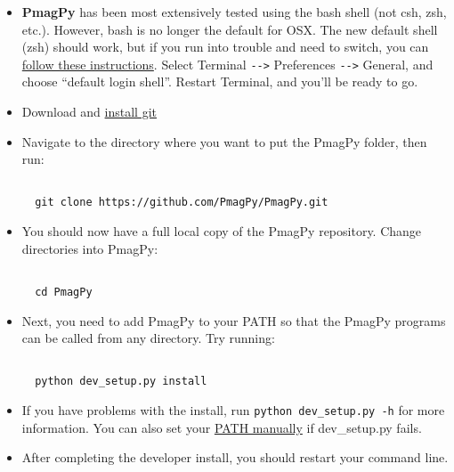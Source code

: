 \documentclass[11pt]{article}
\begin{document}
\begin{itemize}

  \item {\bf PmagPy} has been most extensively tested using the bash shell (not csh, zsh, etc.). However, bash is no longer the default for OSX.  The new default shell (zsh) should work, but if you run into trouble and need to switch, you can \href{https://support.apple.com/guide/terminal/change-the-default-shell-trml113/mac}{follow these instructions}.  Select Terminal \verb!-->! Preferences \verb!-->! General, and choose ``default login shell''.  Restart Terminal, and you'll be ready to go.

\item Download and \href{https://git-scm.com/downloads}{install git}

  \item Navigate to the directory where you want to put the PmagPy folder, then run:

\begin{verbatim}

  git clone https://github.com/PmagPy/PmagPy.git
\end{verbatim}

\item You should now have a full local copy of the PmagPy repository.  Change directories into PmagPy:

\begin{verbatim}

  cd PmagPy
\end{verbatim}

\item Next, you need to add PmagPy to your PATH so that the PmagPy programs can be called from any directory. Try running:

\begin{verbatim}

  python dev_setup.py install
\end{verbatim}

\item If you have problems with the install, run \verb!python dev_setup.py -h! for more information.  You can also set your \href{https://earthref.org/PmagPy/cookbook/#setting_path}{PATH manually} if dev\_setup.py fails.

\item After completing the developer install, you should restart your command line.

\end{itemize}
\end{document}

